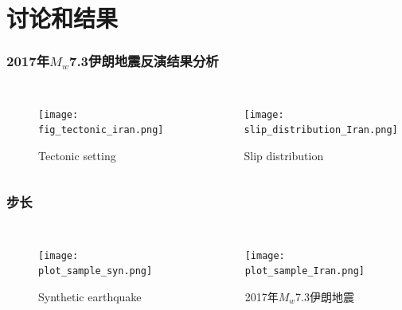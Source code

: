 ﻿\documentclass{beamer}
\begin{document}
\section{讨论和结果}
\begin{frame}
\frametitle{2017年$M_w$7.3伊朗地震反演结果分析}
\begin{columns}

\begin{minipage}[c][0.8\textheight][c]{\linewidth}
\begin{figure}
  \centering
  \texttt{[image: fig\_tectonic\_iran.png]}\\
  \caption{Tectonic setting}\label{fig_tectonic_iran}
\end{figure}
\end{minipage}

\begin{minipage}[c][0.4\textheight][c]{\linewidth}
\begin{figure}
  \centering
  \texttt{[image: slip\_distribution\_Iran.png]}\\
  \caption{Slip distribution}\label{Fig:slip_distribution_Iran}
\end{figure}
\end{minipage}

\end{columns}

\end{frame}

\begin{frame}
\frametitle{步长}
\begin{columns}

\begin{minipage}[c][0.4\textheight][c]{\linewidth}
\begin{figure}
  \texttt{[image: plot\_sample\_syn.png]}\\
  \caption{Synthetic earthquake}\label{Fig:sample_syn}
\end{figure}
\end{minipage}

\begin{minipage}[c][0.4\textheight][c]{\linewidth}
\begin{figure}
  \texttt{[image: plot\_sample\_Iran.png]}\\
  \caption{2017年$M_w$7.3伊朗地震}\label{Fig:plot_sample_Iran}
\end{figure}
\end{minipage}

\end{columns}

\end{frame}
\end{document}
